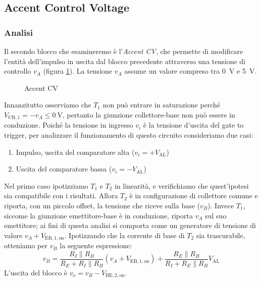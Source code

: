 \documentclass{article}
\newcommand{\var}[2]{#1_\mathrm{#2}}
\theoremstyle{definition}
\begin{document}
\subsection{Accent Control Voltage}

\subsubsection{Analisi}

Il secondo blocco che esamineremo è l'\emph{Accent CV}, che permette di modificare l'entità dell'impulso in uscita dal blocco precedente attraverso una tensione di controllo \(v_A\)
(figura \ref{fig:accent-cv}).
La tensione \(v_A\) assume un valore compreso tra \qty{0}{\volt} e \qty{5}{\volt}. \\

\begin{figure}[ht]
    \centering
    
    \caption{Accent CV}
    \label{fig:accent-cv}
\end{figure}

Innanzitutto osserviamo che \(T_1\) non può entrare in saturazione perché \(\var{V}{CB,1} = -v_A \le \qty{0}{\volt}\), pertanto la giunzione collettore-base non può essere in conduzione.
Poiché la tensione in ingresso \(v_i\) è la tensione d'uscita del gate to trigger, per analizzare il funzionamento di questo circuito consideriamo due casi:

\begin{enumerate}
    \item Impulso, uscita del comparatore alta (\(v_i = +\var{V}{AL}\))
    \item Uscita del comparatore bassa (\(v_i = -\var{V}{AL}\))
\end{enumerate}

Nel primo caso ipotizziamo \(T_1\) e \(T_2\) in linearità, e verifichiamo che quest'ipotesi sia compatibile con i risultati.
Allora \(T_2\) è in configurazione di collettore comune e riporta, con un piccolo offset, la tensione che riceve sulla base (\(v_B\)).
Invece \(T_1\), siccome la giunzione emettitore-base è in conduzione, riporta \(v_A\) sul suo emettitore;
ai fini di questa analisi si comporta come un generatore di tensione di valore \(v_A + \var{V}{EB,1,on}\).
Ipotizzando che la corrente di base di \(T_2\) sia trascurabile, otteniamo per \(v_B\) la seguente espressione:
%
\begin{equation}
    v_B = \frac{R_I \parallel R_B}{R_E + R_I \parallel R_B} \left(v_A + \var{V}{EB,1,on} \right) +
    \frac{R_E \parallel R_B}{R_I + R_E \parallel R_B} \var{V}{AL}
\end{equation}
%
L'uscita del blocco è \(v_o = v_B - \var{V}{BE,2,on}\).
\\
\end{document}

